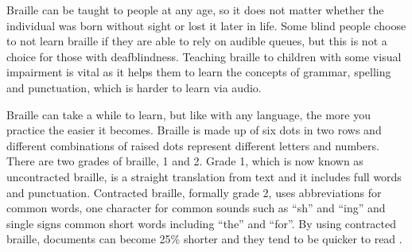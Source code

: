 Braille can be taught to people at any age, so it does not matter whether the individual was born without sight or lost it later in life.
Some blind people choose to not learn braille if they are able to rely on audible queues, but this is not a choice for those with deafblindness.
Teaching braille to children with some visual impairment is vital as it helps them to learn the concepts of grammar, spelling and punctuation, which is harder to learn via audio\cite{sight_scotland_what_nodate}.  

Braille can take a while to learn, but like with any language, the more you practice the easier it becomes.
Braille is made up of six dots in two rows and different combinations of raised dots represent different letters and numbers.
There are two grades of braille, 1 and 2. Grade 1, which is now known as uncontracted braille, is a straight translation from text and it includes full words and punctuation.
Contracted braille, formally grade 2, uses abbreviations for common words, one character for common sounds such as ``sh'' and ``ing'' and single signs common short words including ``the'' and ``for''.
By using contracted braille, documents can become 25\% shorter and they tend to be quicker to read \cite{royal_national_institute_of_blind_people_braille_nodate,sense_braille_nodate}.  
